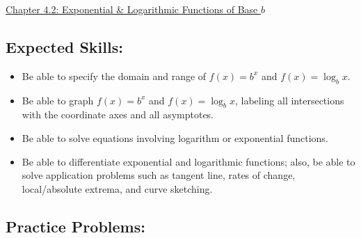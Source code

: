 \documentclass[12pt]{article}
\begin{document}
\begin{center}
\underline{\LARGE{Chapter 4.2: Exponential \& Logarithmic Functions of Base $b$}}
\end{center}

\subsection*{Expected Skills:}

\begin{itemize}

\item Be able to specify the domain and range of $f(x)=b^x$ and $f(x)=\log_b{x}$.

\item Be able to graph $f(x)=b^x$ and $f(x)=\log_b{x}$, labeling all intersections with the coordinate axes and all asymptotes.

\item Be able to solve equations involving logarithm or exponential functions.

\item Be able to differentiate exponential and logarithmic functions; also, be able to solve application problems such as tangent line, rates of change, local/absolute extrema, and curve sketching.

\end{itemize}

\subsection*{Practice Problems: }
\end{document}
